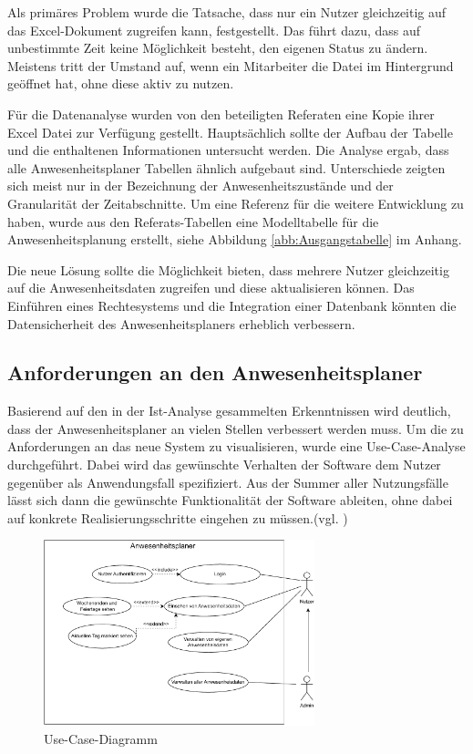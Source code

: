 Als primäres Problem wurde die Tatsache, dass nur ein Nutzer gleichzeitig auf das Excel-Dokument zugreifen kann, festgestellt. Das führt dazu, dass auf unbestimmte Zeit keine Möglichkeit besteht, den eigenen Status zu ändern. Meistens tritt der Umstand auf, wenn ein Mitarbeiter die Datei im Hintergrund geöffnet hat, ohne diese aktiv zu nutzen.

Für die Datenanalyse wurden von den beteiligten Referaten eine Kopie ihrer Excel Datei zur Verfügung gestellt. Hauptsächlich sollte der Aufbau der Tabelle und die enthaltenen Informationen untersucht werden. Die Analyse ergab, dass alle Anwesenheitsplaner Tabellen ähnlich aufgebaut sind. Unterschiede zeigten sich meist nur in der Bezeichnung der Anwesenheitszustände und der Granularität der Zeitabschnitte. Um eine Referenz für die weitere Entwicklung zu haben, wurde aus den Referats-Tabellen eine Modelltabelle für die Anwesenheitsplanung erstellt, siehe Abbildung \ref{abb:Ausgangstabelle} im Anhang.

Die neue Lösung sollte die Möglichkeit bieten, dass mehrere Nutzer gleichzeitig auf die Anwesenheitsdaten zugreifen und diese aktualisieren können. Das Einführen eines Rechtesystems und die Integration einer Datenbank könnten die Datensicherheit des Anwesenheitsplaners erheblich verbessern.

\subsection{Anforderungen an den Anwesenheitsplaner}
\label{sec:Soll-Zustand}
Basierend auf den in der Ist-Analyse gesammelten Erkenntnissen wird deutlich, dass der Anwesenheitsplaner an vielen Stellen verbessert werden muss. Um die zu Anforderungen an das neue System zu visualisieren, wurde eine Use-Case-Analyse durchgeführt. Dabei wird das gewünschte Verhalten der Software dem Nutzer gegenüber als Anwendungsfall spezifiziert. Aus der Summer aller Nutzungsfälle lässt sich dann die gewünschte Funktionalität der Software ableiten, ohne dabei auf konkrete Realisierungsschritte eingehen zu müssen.(vgl. \cite[S. 164]{neumann-2002})

\begin{figure}[htb]
    \centering
    \includegraphics[width=0.7\textwidth,angle=0]{abb/use-case-diagramm.pdf}
    \caption[Use-Case-Diagramm]{Use-Case-Diagramm}
    \label{fig:Use-Case-Diagramm}
\end{figure}

